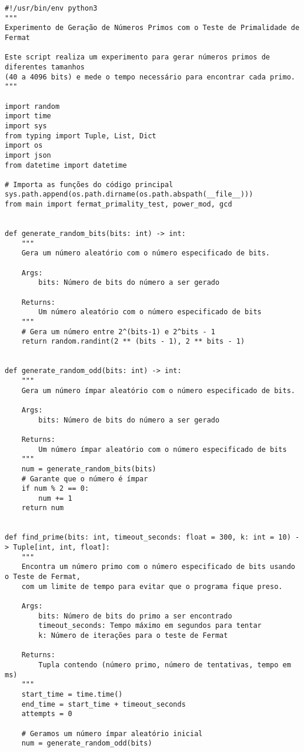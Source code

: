 \begin{verbatim}
#!/usr/bin/env python3
"""
Experimento de Geração de Números Primos com o Teste de Primalidade de Fermat

Este script realiza um experimento para gerar números primos de diferentes tamanhos
(40 a 4096 bits) e mede o tempo necessário para encontrar cada primo.
"""

import random
import time
import sys
from typing import Tuple, List, Dict
import os
import json
from datetime import datetime

# Importa as funções do código principal
sys.path.append(os.path.dirname(os.path.abspath(__file__)))
from main import fermat_primality_test, power_mod, gcd


def generate_random_bits(bits: int) -> int:
    """
    Gera um número aleatório com o número especificado de bits.
    
    Args:
        bits: Número de bits do número a ser gerado
        
    Returns:
        Um número aleatório com o número especificado de bits
    """
    # Gera um número entre 2^(bits-1) e 2^bits - 1
    return random.randint(2 ** (bits - 1), 2 ** bits - 1)


def generate_random_odd(bits: int) -> int:
    """
    Gera um número ímpar aleatório com o número especificado de bits.
    
    Args:
        bits: Número de bits do número a ser gerado
        
    Returns:
        Um número ímpar aleatório com o número especificado de bits
    """
    num = generate_random_bits(bits)
    # Garante que o número é ímpar
    if num % 2 == 0:
        num += 1
    return num


def find_prime(bits: int, timeout_seconds: float = 300, k: int = 10) -> Tuple[int, int, float]:
    """
    Encontra um número primo com o número especificado de bits usando o Teste de Fermat,
    com um limite de tempo para evitar que o programa fique preso.
    
    Args:
        bits: Número de bits do primo a ser encontrado
        timeout_seconds: Tempo máximo em segundos para tentar
        k: Número de iterações para o teste de Fermat
        
    Returns:
        Tupla contendo (número primo, número de tentativas, tempo em ms)
    """
    start_time = time.time()
    end_time = start_time + timeout_seconds
    attempts = 0
    
    # Geramos um número ímpar aleatório inicial
    num = generate_random_odd(bits)
    

\end{verbatim}
